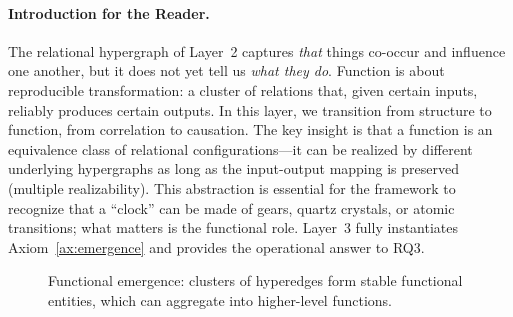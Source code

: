 \paragraph{Introduction for the Reader.}
The relational hypergraph of Layer~2 captures \emph{that} things co-occur and influence one another, but it does not yet tell us \emph{what they do}. Function is about reproducible transformation: a cluster of relations that, given certain inputs, reliably produces certain outputs. In this layer, we transition from structure to function, from correlation to causation. The key insight is that a function is an equivalence class of relational configurations—it can be realized by different underlying hypergraphs as long as the input-output mapping is preserved (multiple realizability). This abstraction is essential for the framework to recognize that a ``clock'' can be made of gears, quartz crystals, or atomic transitions; what matters is the functional role. Layer~3 fully instantiates Axiom~\ref{ax:emergence} and provides the operational answer to RQ3.

\begin{figure}[htbp]
    \centering
    \caption{Functional emergence: clusters of hyperedges form stable functional entities, which can aggregate into higher-level functions.}
    \label{fig:layer3}
\end{figure}

